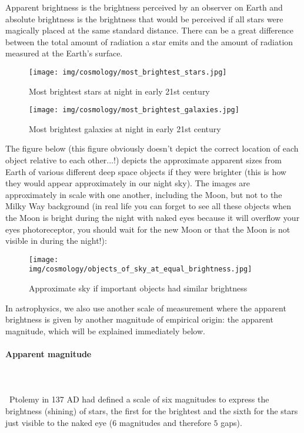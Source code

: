 	Apparent brightness is the brightness perceived by an observer on Earth and absolute brightness is the brightness that would be perceived if all stars were magically placed at the same standard distance. There can be a great difference between the total amount of radiation a star emits and the amount of radiation measured at the Earth's surface.
	\begin{figure}[H]
		\centering
		\texttt{[image: img/cosmology/most\_brightest\_stars.jpg]}	
		\caption{Most brightest stars at night in early 21st century}
	\end{figure}
	\begin{figure}[H]
		\centering
		\texttt{[image: img/cosmology/most\_brightest\_galaxies.jpg]}	
		\caption{Most brightest galaxies at night in early 21st century}
	\end{figure}	
	The figure below (this figure obviously doesn't depict the correct location of each object relative to each other...!) depicts the approximate apparent sizes from Earth of various different deep space objects if they were brighter (this is how they would appear approximately in our night sky). The images are approximately in scale with one another, including the Moon, but not to the Milky Way background (in real life you can forget to see all these objects when the Moon is bright during the night with naked eyes because it will overflow your eyes photoreceptor, you should wait for the new Moon or that the Moon is not visible in during the night!):
	\begin{figure}[H]
		\centering
		\texttt{[image: img/cosmology/objects\_of\_sky\_at\_equal\_brightness.jpg]}	
		\caption{Approximate sky if important objects had similar brightness}
	\end{figure}		
	In astrophysics, we also use another scale of measurement where the apparent brightness is given by another magnitude of empirical origin: the apparent magnitude, which will be explained immediately below.
	
	\paragraph{Apparent magnitude}\mbox{}\\\\\
	Ptolemy in 137 AD had defined a scale of six magnitudes to express the brightness (shining) of stars, the first for the brightest and the sixth for the stars just visible to the naked eye ($6$ magnitudes and therefore $5$ gaps).

